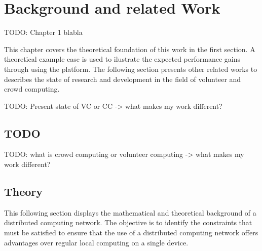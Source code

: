 \chapter{Background and related Work}
\label{ch:background}
TODO: Chapter 1 blabla

This chapter covers the theoretical foundation of this work in the first section. A theoretical example case is used to ilustrate the expected performance gains through using the platform. The following section presents other related works to describes the state of research and development in the field of volunteer and crowd computing.

TODO: Present state of VC or CC -> what makes my work different?

\section{TODO}
TODO: what is crowd computing or volunteer computing -> what makes my work different? 

\section{Theory}
\label{sec:background:theory}
This following section displays the mathematical and theoretical background of a distributed computing network. The objective is to identify the constraints that must be satisfied to ensure that the use of a distributed computing network offers advantages over regular local computing on a single device.

